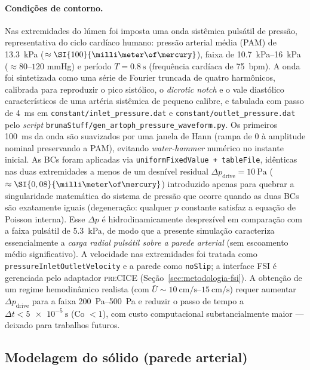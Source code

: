 \paragraph{Condições de contorno.}
Nas extremidades do lúmen foi imposta uma onda sistêmica pulsátil de pressão, representativa do ciclo cardíaco humano: pressão arterial média (PAM) de \SI{13,3}{\kilo\pascal} (\(\approx \SI{100}{\milli\meter\of\mercury}\)), faixa de \SIrange{10,7}{16}{\kilo\pascal} (\(\approx 80\text{--}120\) mmHg) e período \(T = \SI{0,8}{\second}\) (frequência cardíaca de \SI{75}{bpm}). A onda foi sintetizada como uma série de Fourier truncada de quatro harmônicos, calibrada para reproduzir o pico sistólico, o \emph{dicrotic notch} e o vale diastólico característicos de uma artéria sistêmica de pequeno calibre, e tabulada com passo de \SI{4}{\milli\second} em \texttt{constant/inlet\_pressure.dat} e \texttt{constant/outlet\_pressure.dat} pelo \emph{script} \texttt{brunaStuff/gen\_artoph\_pressure\_waveform.py}. Os primeiros \SI{100}{\milli\second} da onda são suavizados por uma janela de Hann (rampa de \(0\) à amplitude nominal preservando a PAM), evitando \emph{water-hammer} numérico no instante inicial. As BCs foram aplicadas via \texttt{uniformFixedValue + tableFile}, idênticas nas duas extremidades a menos de um desnível residual \(\Delta p_{\mathrm{drive}} = \SI{10}{\pascal}\) (\(\approx \SI{0,08}{\milli\meter\of\mercury}\)) introduzido apenas para quebrar a singularidade matemática do sistema de pressão que ocorre quando as duas BCs são exatamente iguais (degeneração: qualquer \(p\) constante satisfaz a equação de Poisson interna). Esse \(\Delta p\) é hidrodinamicamente desprezível em comparação com a faixa pulsátil de \SI{5,3}{\kilo\pascal}, de modo que a presente simulação caracteriza essencialmente a \emph{carga radial pulsátil sobre a parede arterial} (sem escoamento médio significativo). A velocidade nas extremidades foi tratada como \texttt{pressureInletOutletVelocity} e a parede como \texttt{noSlip}; a interface FSI é gerenciada pelo adaptador \textsc{preCICE} (Seção~\ref{sec:metodologia-fsi}). A obtenção de um regime hemodinâmico realista (com \(\bar U \sim \SIrange{10}{15}{\centi\meter\per\second}\)) requer aumentar \(\Delta p_{\mathrm{drive}}\) para a faixa \SIrange{200}{500}{\pascal} e reduzir o passo de tempo a \(\Delta t < \SI{5e-5}{\second}\) (Co \(< 1\)), com custo computacional substancialmente maior --- deixado para trabalhos futuros.

\subsection{Modelagem do sólido (parede arterial)}
\label{sec:metodologia-solido}

